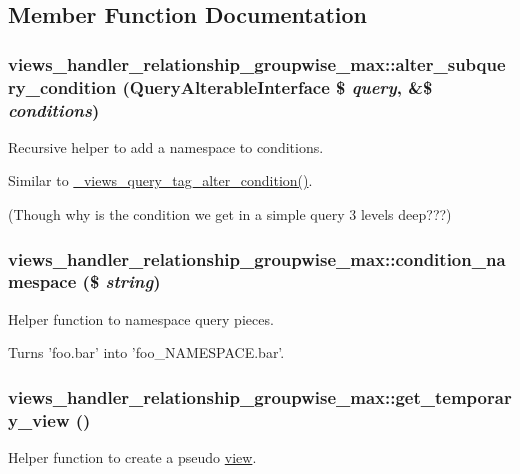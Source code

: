 \subsection{Member Function Documentation}
\hypertarget{classviews__handler__relationship__groupwise__max_a70411d08b3516619b376be6b3411d70c}{
\subsubsection[{alter\_\-subquery\_\-condition}]{\setlength{\rightskip}{0pt plus 5cm}views\_\-handler\_\-relationship\_\-groupwise\_\-max::alter\_\-subquery\_\-condition ({\bf QueryAlterableInterface} \$ {\em query}, \/  \&\$ {\em conditions})}}
\label{classviews__handler__relationship__groupwise__max_a70411d08b3516619b376be6b3411d70c}
Recursive helper to add a namespace to conditions.

Similar to \hyperlink{views_8module_a51cb108c148c7478b50e6262e216a17d}{\_\-views\_\-query\_\-tag\_\-alter\_\-condition()}.

(Though why is the condition we get in a simple query 3 levels deep???) \hypertarget{classviews__handler__relationship__groupwise__max_af6f3f64602d39ea3f4620f06534c5779}{
\subsubsection[{condition\_\-namespace}]{\setlength{\rightskip}{0pt plus 5cm}views\_\-handler\_\-relationship\_\-groupwise\_\-max::condition\_\-namespace (\$ {\em string})}}
\label{classviews__handler__relationship__groupwise__max_af6f3f64602d39ea3f4620f06534c5779}
Helper function to namespace query pieces.

Turns 'foo.bar' into 'foo\_\-NAMESPACE.bar'. \hypertarget{classviews__handler__relationship__groupwise__max_a2af65fae1b0d97331ccf817be451399c}{
\subsubsection[{get\_\-temporary\_\-view}]{\setlength{\rightskip}{0pt plus 5cm}views\_\-handler\_\-relationship\_\-groupwise\_\-max::get\_\-temporary\_\-view ()}}
\label{classviews__handler__relationship__groupwise__max_a2af65fae1b0d97331ccf817be451399c}
Helper function to create a pseudo \hyperlink{classview}{view}.

